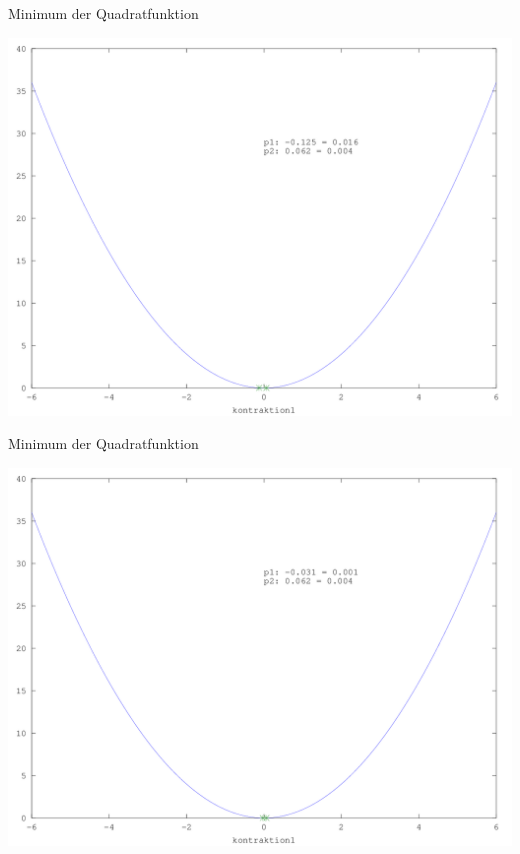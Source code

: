 \documentclass[\outputformat]{beamer}
\begin{document}
\begin{frame}{Minimum der Quadratfunktion}
	\begin{center}
		\includegraphics[height=0.75\paperheight]{../bilder/Quadrat/sinx_x007.png}
	\end{center}
\end{frame}
\begin{frame}{Minimum der Quadratfunktion}
	\begin{center}
		\includegraphics[height=0.75\paperheight]{../bilder/Quadrat/sinx_x008.png}
	\end{center}
\end{frame}
\end{document}
